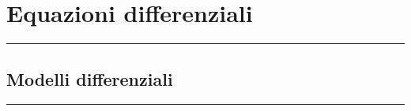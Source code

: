 \section*{Equazioni differenziali}
\rule{\textwidth}{2pt}
\subsection*{Modelli differenziali}
\rule{\textwidth}{0.4pt}